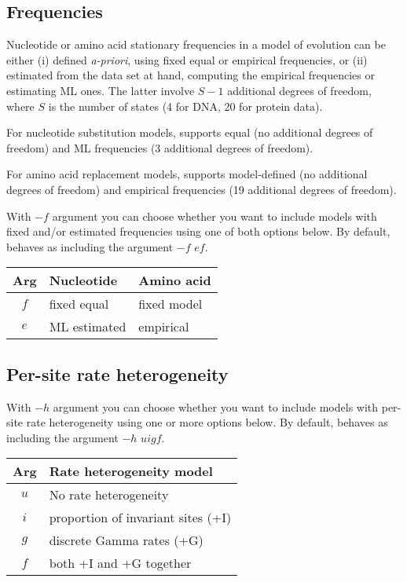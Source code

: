 \subsection{Frequencies}
\label{sec:arg:freqs}

Nucleotide or amino acid stationary frequencies in a model of evolution can be either (i) defined {\em a-priori},
using fixed equal or empirical frequencies, or (ii) estimated from the data set at hand,
computing the empirical frequencies or estimating ML ones.
The latter involve $S-1$ additional degrees of freedom, where $S$ is the number of states (4 for DNA, 20 for protein data).

For nucleotide substitution models, \modeltest supports equal (no additional degrees of freedom) and ML frequencies (3 additional degrees of freedom).

For amino acid replacement models, \modeltest supports model-defined (no additional degrees of freedom) and empirical frequencies (19 additional degrees of freedom).

With $-f$ argument you can choose whether you want to include models with fixed and/or estimated frequencies using one of both options below.
By default, \modeltest behaves as including the argument $-f$ $ef$.

\vspace{1em}
\begin{tabular}{cll}
  {\bf Arg} & {\bf Nucleotide} & {\bf Amino acid} \\
  \hline
    $f$     & fixed equal      & fixed model \\
    $e$     & ML estimated     & empirical \\
\end{tabular}


\subsection{Per-site rate heterogeneity}
\label{sec:arg:ratehet}

With $-h$ argument you can choose whether you want to include models with per-site rate heterogeneity using one or more options below.
By default, \modeltest behaves as including the argument $-h$ $uigf$.

\vspace{1em}
\begin{tabular}{cl}
  {\bf Arg} & {\bf Rate heterogeneity model} \\
  \hline
    $u$     & No rate heterogeneity \\
    $i$     & proportion of invariant sites (+I) \\
    $g$     & discrete Gamma rates (+G) \\
    $f$     & both +I and +G together \\
\end{tabular}


